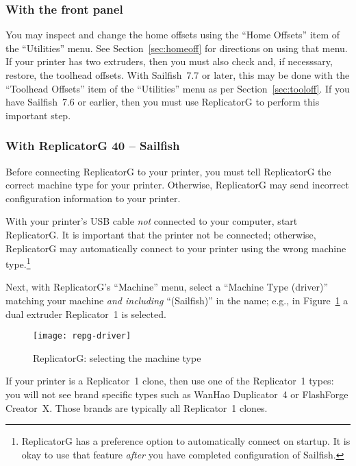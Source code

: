 
\subsubsection{With the front panel}

You may inspect and change the home offsets using the ``Home Offsets'' item of
the ``Utilities'' menu.  See Section~\ref{sec:homeoff}
for directions on using that menu.  If your
printer has two extruders, then you must also check and, if necesssary,
restore, the toolhead offsets.  With Sailfish~7.7 or later, this may be done
with the ``Toolhead Offsets'' item of the ``Utilities'' menu as per
Section~\ref{sec:tooloff}.  If you have
Sailfish~7.6 or earlier, then you must use ReplicatorG to perform this
important step.


\subsubsection{With ReplicatorG 40 -- Sailfish} \label{sec:machine-type}

Before connecting ReplicatorG to your printer, you must tell ReplicatorG the
correct machine type for your printer.  Otherwise, ReplicatorG may send
incorrect configuration information to your printer.

With your printer's USB cable \emph{not} connected to your computer, start
ReplicatorG.  It is important that the printer not be connected; otherwise,
ReplicatorG may automatically connect to your printer using the wrong
machine type.\footnote{ReplicatorG has a preference option to automatically
connect on startup. It is okay to use that feature \emph{after} you have completed
configuration of Sailfish.}

Next, with ReplicatorG's ``Machine'' menu, select a ``Machine Type (driver)''
matching your machine \emph{and including} ``(Sailfish)'' in the name; e.g.,
in Figure~\ref{fig:repg-driver} a dual extruder Replicator~1 is selected.

\begin{figure}[!htbp]
  \centering
    \texttt{[image: repg-driver]}
    \caption{ReplicatorG: selecting the machine type}
  \label{fig:repg-driver}
\end{figure}

If your printer is a Replicator~1 clone, then use one of the Replicator~1 types:
you will not see brand specific types such as WanHao Duplicator~4 or
FlashForge Creator~X.  Those brands are typically all Replicator~1 clones.

